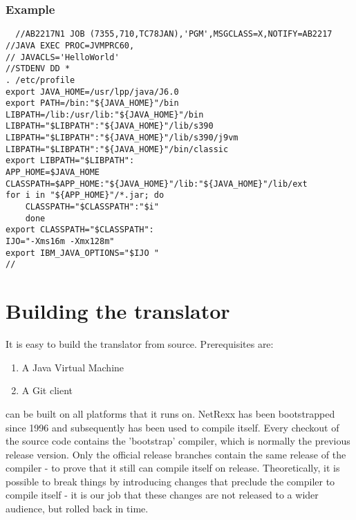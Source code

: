 {\subsection{Example}
\begin{lstlisting}
  //AB2217N1 JOB (7355,710,TC78JAN),'PGM',MSGCLASS=X,NOTIFY=AB2217  
//JAVA EXEC PROC=JVMPRC60,                                        
// JAVACLS='HelloWorld'                                           
//STDENV DD *                                                     
. /etc/profile                                                    
export JAVA_HOME=/usr/lpp/java/J6.0                               
export PATH=/bin:"${JAVA_HOME}"/bin                               
LIBPATH=/lib:/usr/lib:"${JAVA_HOME}"/bin                          
LIBPATH="$LIBPATH":"${JAVA_HOME}"/lib/s390                        
LIBPATH="$LIBPATH":"${JAVA_HOME}"/lib/s390/j9vm                   
LIBPATH="$LIBPATH":"${JAVA_HOME}"/bin/classic                     
export LIBPATH="$LIBPATH":                                        
APP_HOME=$JAVA_HOME                                               
CLASSPATH=$APP_HOME:"${JAVA_HOME}"/lib:"${JAVA_HOME}"/lib/ext     
for i in "${APP_HOME}"/*.jar; do                                  
    CLASSPATH="$CLASSPATH":"$i"                                   
    done                                                          
export CLASSPATH="$CLASSPATH":                                    
IJO="-Xms16m -Xmx128m"                                            
export IBM_JAVA_OPTIONS="$IJO "                                   
//
\end{lstlisting}
\chapter{Building the \nr{} translator}
It is easy to build the \nr{} translator from source. Prerequisites
are:
\begin{enumerate}
\item A Java Virtual Machine
\item A Git client
\end{enumerate}

\nr{} can be built on all platforms that it runs on. NetRexx has been
bootstrapped since 1996 and subsequently has been used to compile
itself. Every checkout of the source code contains the 'bootstrap'
compiler, which is normally the previous release version. Only the official
release branches contain the same release of the compiler - to prove
that it still can compile itself on release. Theoretically, it is
possible to break things by introducing changes that preclude the compiler to compile itself - it is our job that
these changes are not released to a wider audience, but rolled back in
time.
}
